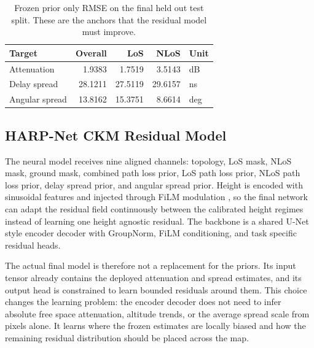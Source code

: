 \documentclass[journal]{IEEEtran}
\begin{document}
\begin{table}[!t]
\centering
\caption{Frozen prior only RMSE on the final held out test split. These are the
anchors that the residual model must improve.}
\label{tab:prior-only-anchor}
\scriptsize
\setlength{\tabcolsep}{4pt}
\begin{tabular}{lrrrl}
\toprule
Target & Overall & LoS & NLoS & Unit \\
\midrule
Attenuation & 1.9383 & 1.7519 & 3.5143 & dB \\
Delay spread & 28.1211 & 27.5119 & 29.6157 & ns \\
Angular spread & 13.8162 & 15.3751 & 8.6614 & deg \\
\bottomrule
\end{tabular}
\end{table}

\subsection{HARP-Net CKM Residual Model}

The neural model receives nine aligned channels: topology, LoS mask, NLoS
mask, ground mask, combined path loss prior, LoS path loss prior, NLoS
path loss prior, delay spread prior, and angular spread prior. Height is
encoded with sinusoidal features and injected through FiLM modulation
\cite{perez2018film}, so the final network can adapt the residual field
continuously between the calibrated height regimes instead of learning one
height agnostic residual. The backbone is a shared U-Net style
encoder decoder with GroupNorm, FiLM conditioning, and task specific residual
heads.

The actual final model is therefore not a replacement for the priors. Its
input tensor already contains the deployed attenuation and spread estimates, and
its output head is constrained to learn bounded residuals around them. This
choice changes the learning problem: the encoder decoder does not need to infer
absolute free space attenuation, altitude trends, or the average spread scale
from pixels alone. It learns where the frozen estimates are locally biased and
how the remaining residual distribution should be placed across the map.
\end{document}
